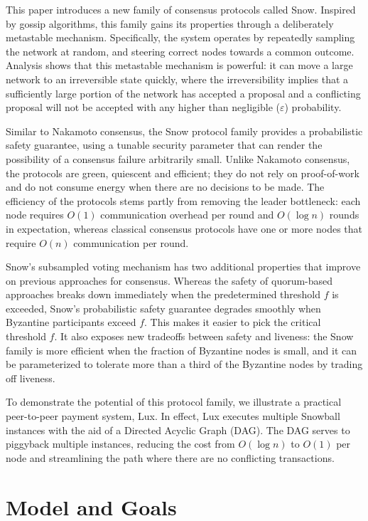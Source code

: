 \documentclass[11pt]{article}
\begin{document}
This paper introduces a new family of consensus protocols
called Snow. Inspired by gossip algorithms, this family gains
its properties through a deliberately metastable mechanism.
Specifically, the system operates by repeatedly sampling
the network at random, and steering correct nodes towards a common outcome. Analysis shows that this metastable mechanism
is powerful: it can move a large network to an irreversible state
quickly, where the irreversibility implies that a sufficiently
large portion of the network has accepted a proposal and a
conflicting proposal will not be accepted with any higher than
negligible ($\varepsilon$) probability.

Similar to Nakamoto consensus, the Snow protocol family
provides a probabilistic safety guarantee, using a tunable security parameter that can render the possibility of a consensus
failure arbitrarily small. Unlike Nakamoto consensus, the protocols are green, quiescent and efficient; they do not rely on
proof-of-work and do not consume energy when there are
no decisions to be made. The efficiency of the protocols stems
partly from removing the leader bottleneck: each node requires
$O(1)$ communication overhead per round and $O(\log n)$ rounds
in expectation, whereas classical consensus protocols have
one or more nodes that require $O(n)$ communication per round.

Snow's subsampled voting mechanism has two additional
properties that improve on previous approaches for consensus.
Whereas the safety of quorum-based approaches breaks down
immediately when the predetermined threshold $f$ is exceeded,
Snow's probabilistic safety guarantee degrades smoothly when
Byzantine participants exceed $f$. This makes it easier to
pick the critical threshold $f$. It also exposes new tradeoffs
between safety and liveness: the Snow family is more efficient
when the fraction of Byzantine nodes is small, and it can be
parameterized to tolerate more than a third of the Byzantine
nodes by trading off liveness.

To demonstrate the potential of this protocol family, we
illustrate a practical peer-to-peer payment system, Lux.
In effect, Lux executes multiple Snowball instances with the aid of a Directed Acyclic
Graph (DAG). The DAG serves to piggyback multiple instances, reducing the cost from $O(\log n)$ to $O(1)$ per node
and streamlining the path where there are no conflicting
transactions.

\section{Model and Goals}\label{sec:model}
\end{document}
